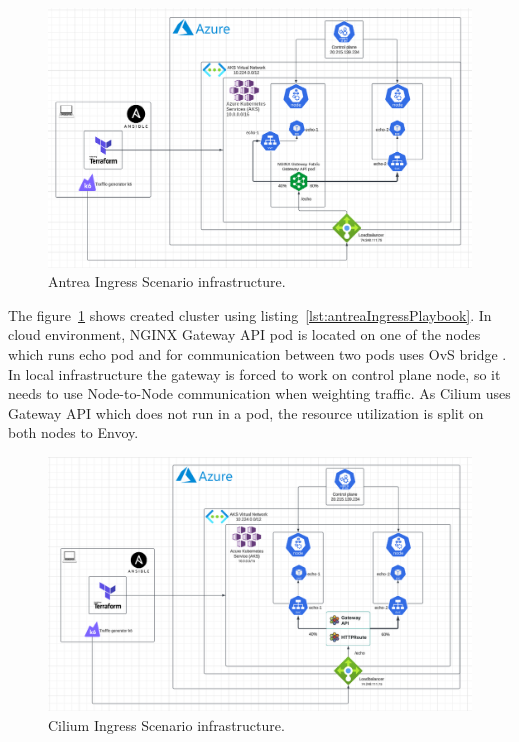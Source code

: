 \begin{figure}[tbh]
  \centering
  \includegraphics[width=1\columnwidth]{images/antrea_cloud_traffic_splitting.png}
  \caption{Antrea Ingress Scenario infrastructure.}
  \label{fig:antreaIngressScenarioArch}
\end{figure}

The figure~\ref{fig:antreaIngressScenarioArch} shows created cluster using listing~\ref{lst:antreaIngressPlaybook}. In cloud environment, NGINX Gateway API pod is located on one of the nodes which runs echo pod and for communication between two pods uses OvS bridge \cite{AntreaArch}. In local infrastructure the gateway is forced to work on control plane node, so it needs to use Node-to-Node communication when weighting traffic. As Cilium uses Gateway API which does not run in a pod, the resource utilization is split on both nodes to Envoy.



\begin{figure}[H]
  \centering
  \includegraphics[width=1\columnwidth]{images/cilium_cloud_traffic_splitting.png}
  \caption{Cilium Ingress Scenario infrastructure.}
  \label{fig:ciliumIngressScenarioArch}
\end{figure}

